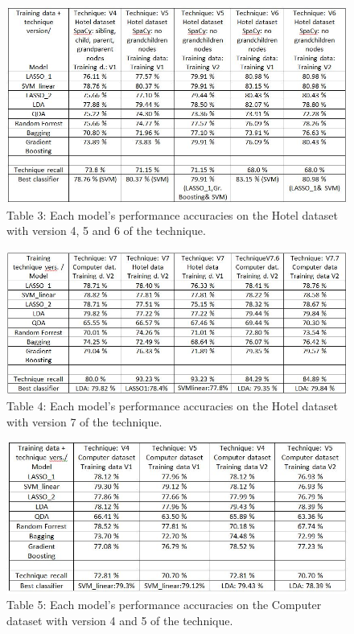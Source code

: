 \documentclass{sig-alternate}
\begin{document}
\begin{figure}
\centering
\includegraphics[scale=0.55]{images/res1.JPG}
Table 3: Each model's performance accuracies on the Hotel dataset with version 4, 5 and 6 of the technique.
\end{figure}

\begin{figure}
\centering
\includegraphics[scale=0.55]{images/res2.JPG}
Table 4: Each model's performance accuracies on the Hotel dataset with version 7 of the technique.
\end{figure}

\begin{figure}
\centering
\includegraphics[scale=0.60]{images/res3.JPG}
Table 5: Each model's performance accuracies on the Computer dataset with version 4 and 5 of the technique.
\end{figure}
\end{document}
